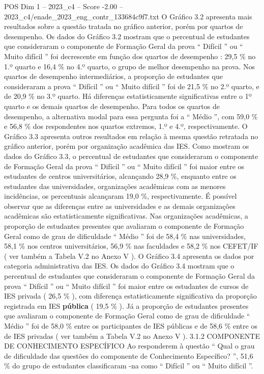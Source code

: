 \begin{textsample}{POS Dim 1 – 2023\_c4 – Score -2.00 – 2023\_c4/enade\_2023\_eng\_contr\_133684c9f7.txt}
O Gráfico 3.2 apresenta mais resultados sobre a questão tratada no gráfico anterior, porém por quartos de desempenho.
Os dados do Gráfico 3.2 mostram que o percentual de estudantes que consideraram o componente de Formação Geral da prova “ Difícil ” ou “ Muito difícil ” foi decrescente em função dos quartos de desempenho : 29,5 \% no 1.º quarto e 16,4 \% no 4.º quarto, o grupo de melhor desempenho na prova.
Nos quartos de desempenho intermediários, a proporção de estudantes que consideraram a prova “ Difícil ” ou “ Muito difícil ” foi de 21,5 \% no 2.º quarto, e de 20,9 \% no 3.º quarto.
Há diferenças estatisticamente significativas entre o 1º quarto e os demais quartos de desempenho.
Para todos os quartos de desempenho, a alternativa modal para essa pergunta foi a “ Médio ”, com 59,0 \% e 56,8 \% dos respondentes nos quartos extremos, 1.º e 4.º, respectivamente.
O Gráfico 3.3 apresenta outros resultados em relação à mesma questão retratada no gráfico anterior, porém por organização acadêmica das IES.
Como mostram os dados do Gráfico 3.3, o percentual de estudantes que consideraram o componente de Formação Geral da prova “ Difícil ” ou “ Muito difícil ” foi maior entre os estudantes de centros universitários, alcançando 28,9 \%, enquanto entre os estudantes das universidades, organizações acadêmicas com as menores incidências, os percentuais alcançaram 19,0 \%, respectivamente.
É possível observar que as diferenças entre as universidades e as demais organizações acadêmicas são estatisticamente significativas.
Nas organizações acadêmicas, a proporção de estudantes presentes que avaliaram o componente de Formação Geral como de grau de dificuldade “ Médio ” foi de 58,4 \% nas universidades, 58,1 \% nos centros universitários, 56,9 \% nas faculdades e 58,2 \% nos CEFET/IF ( ver também a Tabela V.2 no Anexo V ).
O Gráfico 3.4 apresenta os dados por categoria administrativa das IES.
Os dados do Gráfico 3.4 mostram que o percentual de estudantes que consideraram o componente de Formação Geral da prova “ Difícil ” ou “ Muito difícil ” foi maior entre os estudantes de cursos de IES privada ( 26,5 \% ), com diferença estatisticamente significativa da proporção registrada em IES \textbf{pública} ( 19,5 \% ).
Já a proporção de estudantes presentes que avaliaram o componente de Formação Geral como de grau de dificuldade “ Médio ” foi de 58,0 \% entre os participantes de IES públicas e de 58,6 \% entre os de IES privadas ( ver também a Tabela V.2 no Anexo V ). 3.1.2 COMPONENTE DE CONHECIMENTO ESPECÍFICO Ao responderem à questão “ Qual o grau de dificuldade das questões do componente de Conhecimento Específico? ”, 51,6 \% do grupo de estudantes classificaram -na como “ Difícil ” ou “ Muito difícil ”.

\end{textsample}

